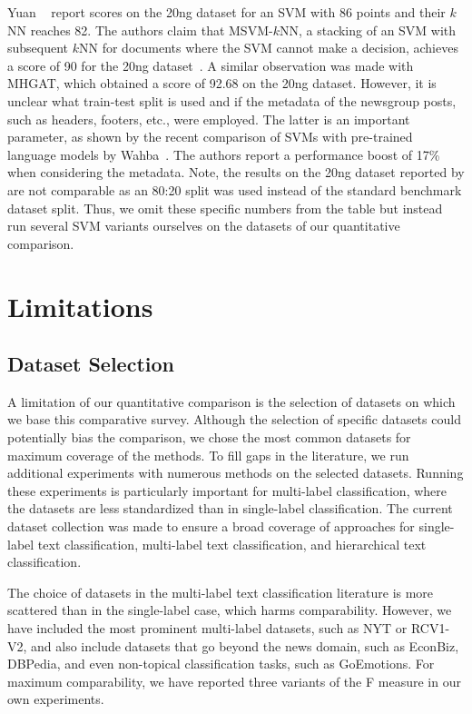 Yuan \etal~\cite{YuanEtAl-MSVM-kNN-2008} report scores on the 20ng dataset for an SVM with 86 points and their $k$NN reaches 82.
The authors claim that MSVM-$k$NN, a stacking of an SVM with subsequent $k$NN for documents where the SVM cannot make a decision, achieves a score of 90 for the 20ng dataset~\cite{YuanEtAl-MSVM-kNN-2008}.
A similar observation was made with MHGAT, which obtained a score of 92.68 on the 20ng dataset.
However, it is unclear what train-test split is used and if the metadata of the newsgroup posts, such as headers, footers, etc., were employed.
The latter is an important parameter, as shown by the recent comparison of SVMs with pre-trained language models by Wahba~\etal\cite{DBLP:journals/corr/abs-2211-02563}.
The authors report a performance boost of 17\% when considering the metadata. 
Note, the results on the 20ng dataset reported by \cite{DBLP:journals/corr/abs-2211-02563} are not comparable as an 80:20 split was used instead of the standard benchmark dataset split.
Thus, we omit these specific numbers from the table but instead run several SVM variants ourselves on the datasets of our quantitative comparison.

\section{Limitations}\label{sec:limitations}

\subsection{Dataset Selection}
A limitation of our quantitative comparison is the selection of datasets on which we base this comparative survey. 
Although the selection of specific datasets could potentially bias the comparison, we chose the most common datasets for maximum coverage of the methods. 
To fill gaps in the literature, we run additional experiments with numerous methods on the selected datasets. 
Running these experiments is particularly important for multi-label classification, where the datasets are less standardized than in single-label classification. 
The current dataset collection was made to ensure a broad coverage of approaches for single-label text classification, multi-label text classification, and hierarchical text classification. 

The choice of datasets in the multi-label text classification literature is more scattered than in the single-label case, which harms comparability. 
However, we have included the most prominent multi-label datasets, such as NYT or RCV1-V2, and also include datasets that go beyond the news domain, such as EconBiz, DBPedia, and even non-topical classification tasks, such as GoEmotions. 
For maximum comparability, we have reported three variants of the F measure in our own experiments.

